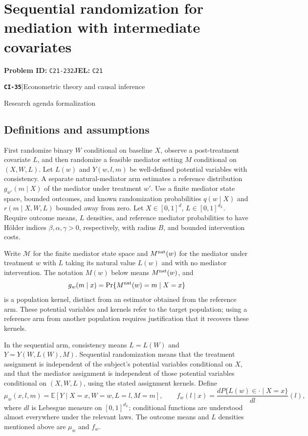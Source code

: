 \documentclass[11pt,a4paper]{article}
\newcommand{\E}{\mathbb E}
\newcommand{\entrymeta}[3]{{\sffamily\small\color{muted}\textbf{\texttt{#1}}\quad|\quad #2\par #3\par}}
\begin{document}
\section*{Sequential randomization for mediation with intermediate covariates}
\textbf{Problem ID:} \texttt{C21-232}\quad \textbf{JEL:} \texttt{C21}\par
\label{problem:OP-0514}
\label{beyond:CI-35}
\entrymeta{CI-35}{Econometric theory and causal inference}{Research agenda formalization}
\subsection*{Definitions and assumptions}
First randomize binary $W$ conditional on baseline $X$, observe a post-treatment covariate $L$, and then randomize a feasible mediator setting $M$ conditional on $(X,W,L)$. Let $L(w)$ and $Y(w,l,m)$ be well-defined potential variables with consistency. A separate natural-mediator arm estimates a reference distribution $g_{w'}(m\mid X)$ of the mediator under treatment $w'$. Use a finite mediator state space, bounded outcomes, and known randomization probabilities $q(w\mid X)$ and $r(m\mid X,W,L)$ bounded away from zero. Let $X\in[0,1]^d$, $L\in[0,1]^{d_L}$. Require outcome means, $L$ densities, and reference mediator probabilities to have H\"older indices $\beta,\alpha,\gamma>0$, respectively, with radius $B$, and bounded intervention costs.

Write $\mathcal M$ for the finite mediator state space and $M^{\rm nat}(w)$ for the mediator under treatment $w$ with $L$ taking its natural value $L(w)$ and with no mediator intervention. The notation $M(w)$ below means $M^{\rm nat}(w)$, and
\[
 g_w(m\mid x)=\Pr\{M^{\rm nat}(w)=m\mid X=x\}
\]
is a population kernel, distinct from an estimator obtained from the reference arm. These potential variables and kernels refer to the target population; using a reference arm from another population requires justification that it recovers these kernels.

In the sequential arm, consistency means $L=L(W)$ and $Y=Y(W,L(W),M)$. Sequential randomization means that the treatment assignment is independent of the subject's potential variables conditional on $X$, and that the mediator assignment is independent of those potential variables conditional on $(X,W,L)$, using the stated assignment kernels. Define
\[
 \mu_w(x,l,m)=\E[Y\mid X=x,W=w,L=l,M=m],\qquad
 f_w(l\mid x)=\frac{dP\{L(w)\in\cdot\mid X=x\}}{dl}(l),
\]
where $dl$ is Lebesgue measure on $[0,1]^{d_L}$; conditional functions are understood almost everywhere under the relevant laws. The outcome means and $L$ densities mentioned above are $\mu_w$ and $f_w$.
\end{document}
